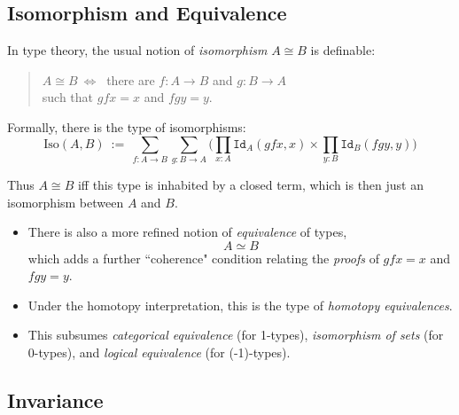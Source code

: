\documentclass[11pt]{article}
\newcommand{\toarrow}{\ensuremath{\rightarrow}}
\newcommand{\id}[1]{\texttt{Id}_{#1}}
\begin{document}
\subsection*{Isomorphism and Equivalence}

In type theory, the usual notion of \emph{isomorphism} $A \cong B$ is definable:

\begin{quote}
$A\cong B\ \Leftrightarrow\ $ there are $f:A\toarrow B$ and $g: B\toarrow A$\\
\hspace{.85in} such that $gfx = x$ and $fgy = y$.
\end{quote}

Formally, there is the type of isomorphisms:
\[
\mathrm{Iso}(A,B)\ :=\ \sum_{f:A\toarrow B}\sum_{g: B\toarrow A}\big(\prod_{x:A}\id{A}(gfx,x)\times\prod_{y:B}\id{B}(fgy,y)\big)
\]

Thus  $A\cong B$ iff this type is inhabited by a closed term,
which is then just an isomorphism between $A$ and $B$.

%

\begin{itemize}
\item There is also a more refined notion of \emph{equivalence} of types,
\[
A \simeq B
\]
which adds a further  ``coherence" condition relating the \emph{proofs} of $gfx = x$ and $fgy = y$.

\item Under the homotopy interpretation, this is the type of \emph{homotopy equivalences}. 

\item This subsumes \emph{categorical equivalence} (for 1-types), \emph{isomorphism of sets} (for 0-types), and \emph{logical equivalence} (for (-1)-types).
\end{itemize}

\subsection*{Invariance}
\end{document}

